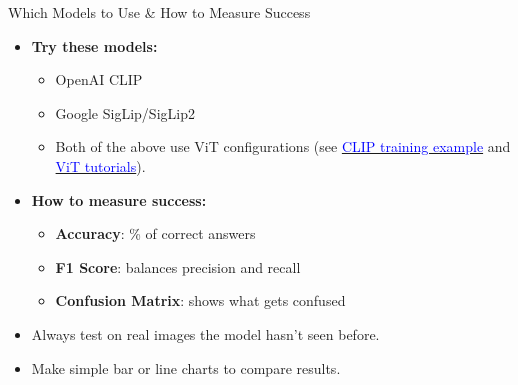 \begin{refsection}
\begin{frame}{Which Models to Use \& How to Measure Success}
  \begin{itemize}
    \item \textbf{Try these models:}
      \begin{itemize}
        \item OpenAI CLIP~\parencite{radfordLearningTransferableVisual2021}
        \item Google SigLip/SigLip2~\parencite{tschannenSigLIP2Multilingual2025,Zhai_2023_ICCV}
        \item Both of the above use ViT configurations (see \href{https://github.com/huggingface/transformers/blob/main/examples/pytorch/contrastive-image-text/README.md}{\textcolor{blue}{CLIP training example}} and \href{https://github.com/NielsRogge/Transformers-Tutorials/tree/master/VisionTransformer}{\textcolor{blue}{ViT tutorials}}).
      \end{itemize}
    \item \textbf{How to measure success:}
      \begin{itemize}
        \item \textbf{Accuracy}: \% of correct answers
        \item \textbf{F1 Score}: balances precision and recall
        \item \textbf{Confusion Matrix}: shows what gets confused
      \end{itemize}
    \item Always test on real images the model hasn’t seen before.
    \item Make simple bar or line charts to compare results.
  \end{itemize}
  \bottomleftrefs
\end{frame}
\end{refsection}

  

